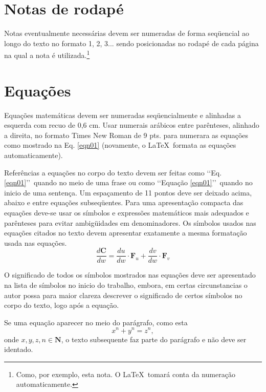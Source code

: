 \section{Notas de rodapé}

Notas eventualmente necessárias devem ser numeradas de forma seqüencial ao 
longo do texto no formato 1, 2, 3... sendo posicionadas no rodapé de cada 
página na qual a nota é utilizada.\footnote{Como, por exemplo, esta nota. O \LaTeX\ tomará conta da numeração automaticamente.}

\section{Equações}

Equações matemáticas devem ser numeradas seqüencialmente e alinhadas a 
esquerda com recuo de 0,6 cm. Usar numerais arábicos entre parênteses, 
alinhado a direita, no formato Times New Roman de 9 pts. para numerara as 
equações como mostrado na Eq. \ref{eqn01} (novamente, o \LaTeX\ formata as
equações automaticamente).

Referências a equações no corpo do texto devem ser feitas como \lq\lq Eq. 
\ref{eqn01}\rq\rq\ quando no meio de uma frase ou como \lq\lq Equação 
\ref{eqn01}\rq\rq\ quando no inicio de uma sentença. Um espaçamento de 11 
pontos deve ser deixado acima, abaixo e entre equações subseqüentes. Para uma 
apresentação compacta das equações deve-se usar os símbolos e expressões 
matemáticos mais adequados e parênteses para evitar ambigüidades em 
denominadores. Os símbolos usados nas equações citados no texto devem 
apresentar exatamente a mesma formatação usada nas equações.
\begin{equation}
\label{eqn01}
	\frac{d\mathbf{C}}{dw} = \frac{du}{dw}\cdot \mathbf{F}_u + 
		\frac{dv}{dw}\cdot \mathbf{F}_v 
\end{equation}

O significado de todos os símbolos mostrados nas equações deve ser apresentado 
na lista de símbolos no inicio do trabalho, embora, em certas circunstancias o 
autor possa para maior clareza descrever o significado de certos símbolos no 
corpo do texto, logo após a equação.

Se uma equação aparecer no meio do parágrafo, como esta
\begin{equation}
x^n + y^n = z^n,
\end{equation}
onde $x, y, z, n \in \mathbf{N}$, o texto subsequente faz parte do parágrafo e 
não deve ser identado.

